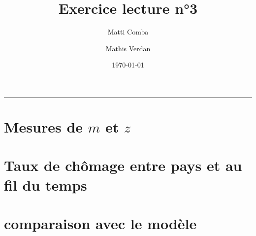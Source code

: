 \documentclass{article}
\title{\Huge \textbf{Exercice lecture n°3}}
\author{Matti Comba \and Mathis Verdan}
\date{\today}
\begin{document}
\maketitle
\begin{center}
  \rule{\linewidth}{0.5mm}
\end{center}


\section{Mesures de $m$ et $z$}


\section{Taux de chômage entre pays et au fil du temps}

\section{comparaison avec le modèle}
\end{document}
